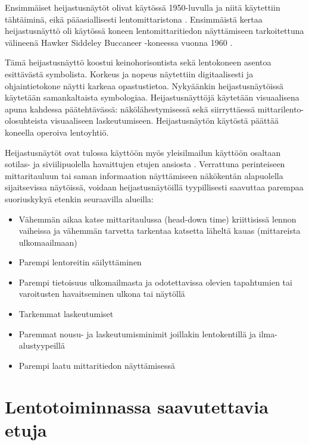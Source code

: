 \documentclass[utf8,bachelor,manualbib]{gradu3}
\begin{document}
Ensimmäiset heijastusnäytöt olivat käytössä 1950-luvulla ja niitä käytettiin tähtäiminä, eikä pääasiallisesti lentomittaristona \citep{crawfordneal2006}. Ensimmäistä kertaa heijastusnäyttö oli käytössä koneen lentomittaritiedon näyttämiseen tarkoitettuna välineenä Hawker Siddeley Buccaneer -koneessa vuonna 1960 \citep{weintraubensing1992}.

Tämä heijastusnäyttö koostui keinohorisontista sekä lentokoneen asentoa esittävästä symbolista. Korkeus ja nopeus näytettiin digitaalisesti ja ohjaintietokone näytti karkeaa opastustietoa. Nykyäänkin heijastusnäytöissä käytetään samankaltaista symbologiaa. Heijastusnäyttöjä käytetään visuaalisena apuna kahdessa päätehtävässä: näkölähestymisessä sekä siirryttäessä mittarilento-olosuhteista visuaaliseen laskeutumiseen. Heijastusnäytön käytöstä päättää koneella operoiva lentoyhtiö. \citep{crawfordneal2006}

Heijastusnäytöt ovat tulossa käyttöön myös yleisilmailun käyttöön osaltaan sotilas- ja siviilipuolella havaittujen etujen ansiosta \citep{ververswickens1998}. Verrattuna perinteiseen mittaritauluun tai saman informaation näyttämiseen näkökentän alapuolella sijaitsevissa näytöissä, voidaan heijastusnäytöillä tyypillisesti saavuttaa parempaa suoriuskykyä etenkin seuraavilla alueilla:

\begin{itemize}
\item Vähemmän aikaa katse mittaritaulussa (head-down time) kriittisissä lennon vaiheissa ja vähemmän tarvetta tarkentaa katsetta läheltä kauas (mittareista ulkomaailmaan) \citep{maywickens1995}
\item Parempi lentoreitin säilyttäminen \citep{fischerym1980, lauberym1982, wickenslong1995}
\item Parempi tietoisuus ulkomailmasta ja odotettavissa olevien tapahtumien tai varoitusten havaitseminen ulkona tai näytöllä \citep{fischer1979, larishwickens1991, maywickens1995, wickenslong1995}
\item Tarkemmat laskeutumiset \citep{naish1964}
\item Paremmat nousu- ja laskeutumisminimit joillakin lentokentillä ja ilma-alustyypeillä \citep{crawfordneal2006}
\item Parempi laatu mittaritiedon näyttämisessä \citep{maywickens1995}
\end{itemize}

\section{Lentotoiminnassa saavutettavia etuja}
\end{document}
